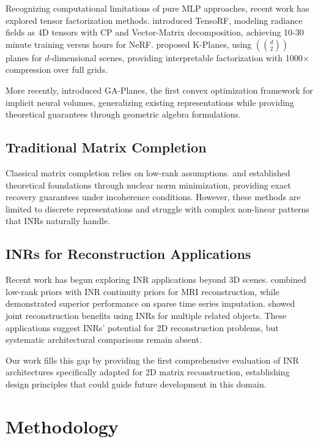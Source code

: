 \documentclass{article}
\begin{document}
Recognizing computational limitations of pure MLP approaches, recent work has explored tensor factorization methods. \citet{chen2022tensorf} introduced TensoRF, modeling radiance fields as 4D tensors with CP and Vector-Matrix decomposition, achieving 10-30 minute training versus hours for NeRF. \citet{fridovich2023kplanes} proposed K-Planes, using $(d \choose 2)$ planes for $d$-dimensional scenes, providing interpretable factorization with 1000× compression over full grids.

More recently, \citet{sivgin2024gaplanes} introduced GA-Planes, the first convex optimization framework for implicit neural volumes, generalizing existing representations while providing theoretical guarantees through geometric algebra formulations.

\subsection{Traditional Matrix Completion}

Classical matrix completion relies on low-rank assumptions. \citet{candes2009matrix} and \citet{recht2011simpler} established theoretical foundations through nuclear norm minimization, providing exact recovery guarantees under incoherence conditions. However, these methods are limited to discrete representations and struggle with complex non-linear patterns that INRs naturally handle.

\subsection{INRs for Reconstruction Applications}

Recent work has begun exploring INR applications beyond 3D scenes. \citet{zhang2025lorein} combined low-rank priors with INR continuity priors for MRI reconstruction, while \citet{li2025imputeinr} demonstrated superior performance on sparse time series imputation. \citet{shi2024inr} showed joint reconstruction benefits using INRs for multiple related objects. These applications suggest INRs' potential for 2D reconstruction problems, but systematic architectural comparisons remain absent.

Our work fills this gap by providing the first comprehensive evaluation of INR architectures specifically adapted for 2D matrix reconstruction, establishing design principles that could guide future development in this domain.

\section{Methodology}
\end{document}
